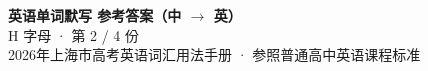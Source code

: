 \documentclass[10pt,a4paper]{article}
\begin{document}
\pagestyle{plain}

\begin{center}
{\LARGE\bfseries 英语单词默写 \quad 参考答案（中 $\to$ 英）}\\[0.22em]
{\large H 字母 · 第 2 / 4 份}\\[0.18em]
{\small 2026年上海市高考英语词汇用法手册 · 参照普通高中英语课程标准}
\end{center}

\vspace{0.2em}
\noindent{\color{rulegray}\rule{\textwidth}{0.8pt}}

\vspace{0.35em}

\vspace{0.25em}
\renewcommand{\arraystretch}{1.32}
\end{document}
